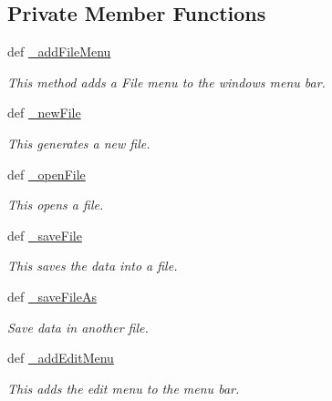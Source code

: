 \subsection*{\-Private \-Member \-Functions}
\begin{DoxyCompactItemize}
\item 
\hypertarget{classgui_1_1window2_1_1mainWindow_aba31902186de9c54cc3cba810c1f3634}{def \hyperlink{classgui_1_1window2_1_1mainWindow_aba31902186de9c54cc3cba810c1f3634}{\-\_\-add\-File\-Menu}}\label{classgui_1_1window2_1_1mainWindow_aba31902186de9c54cc3cba810c1f3634}

\begin{DoxyCompactList}\small\item\em \-This method adds a \-File menu to the windows menu bar. \end{DoxyCompactList}\item 
def \hyperlink{classgui_1_1window2_1_1mainWindow_ab88021b976d074d30b5fdc8561f72192}{\-\_\-new\-File}
\begin{DoxyCompactList}\small\item\em \-This generates a new file. \end{DoxyCompactList}\item 
def \hyperlink{classgui_1_1window2_1_1mainWindow_ac47f719d35c8244134cff4710a4d249a}{\-\_\-open\-File}
\begin{DoxyCompactList}\small\item\em \-This opens a file. \end{DoxyCompactList}\item 
def \hyperlink{classgui_1_1window2_1_1mainWindow_a1d1d8399c211ab2c39ead212fa6c8407}{\-\_\-save\-File}
\begin{DoxyCompactList}\small\item\em \-This saves the data into a file. \end{DoxyCompactList}\item 
def \hyperlink{classgui_1_1window2_1_1mainWindow_a1ffc3abf49be025d4db556ac63a17399}{\-\_\-save\-File\-As}
\begin{DoxyCompactList}\small\item\em \-Save data in another file. \end{DoxyCompactList}\item 
def \hyperlink{classgui_1_1window2_1_1mainWindow_a0c149717ce106ef13e42a04055a55d57}{\-\_\-add\-Edit\-Menu}
\begin{DoxyCompactList}\small\item\em \-This adds the edit menu to the menu bar. \end{DoxyCompactList}\item 

\end{DoxyCompactItemize}
